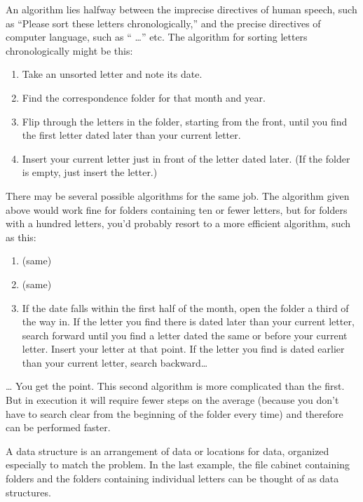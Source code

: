 An algorithm lies halfway between the imprecise directives of
human speech, such as ``Please sort these letters chronologically,'' and the
precise directives of computer language, such as `` \dots{}''
etc. The algorithm for sorting letters chronologically might be this:
\begin{enumerate}
\item Take an unsorted letter and note its date.
\item Find the correspondence folder for that month and year.
\item Flip through the letters in the folder, starting from the front, until
   you find the first letter dated later than your current letter.
\item Insert your current letter just in front of the letter dated later.
   (If the folder is empty, just insert the letter.)
\end{enumerate}
There may be several possible algorithms for the same job. The algorithm
given above would work fine for folders containing ten or fewer letters,
but for folders with a hundred letters, you'd probably resort to a more
efficient algorithm, such as this:
\begin{enumerate}
\item (same)
\item (same)
\item If the date falls within the first half of the month, open the folder a
   third of the way in. If the letter you find there is dated later than your
   current letter, search forward until you find a letter dated the same or
   before your current letter. Insert your letter at that point. If the letter
   you find is dated earlier than your current letter, search backward\dots{}
\end{enumerate}
\dots{} You get the point. This second algorithm is more complicated than
the first. But in execution it will require fewer steps on the average
(because you don't have to search clear from the beginning of the folder
every time) and therefore can be performed faster.

A data structure is an arrangement of data or locations for data,
organized especially to match the problem. In the last example, the file
cabinet containing folders and the folders containing individual letters
can be thought of as data structures.
%

